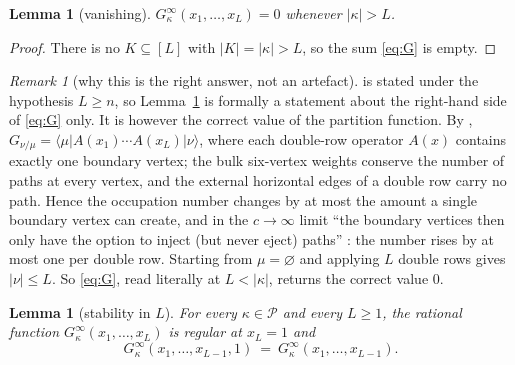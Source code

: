 \documentclass[11pt]{article}
\newtheorem{lem}[thm]{Lemma}
\theoremstyle{definition}
\theoremstyle{remark}
\newtheorem{rem}[thm]{Remark}
\newcommand{\PP}{\mathcal{P}}
\newcommand{\Gi}[1]{G^{\infty}_{#1}}
\begin{document}
\begin{lem}[vanishing]\label{lem:vanish}
$\Gi{\kappa}(x_1,\dots,x_L)=0$ whenever $|\kappa|>L$.
\end{lem}

\begin{proof}
There is no $K\subseteq[L]$ with $|K|=|\kappa|>L$, so the sum \eqref{eq:G} is empty.
\end{proof}

\begin{rem}[why this is the right answer, not an artefact]\label{rem:conserve}
\cite[Theorem \texttt{G nu thm}]{GDMW} is stated under the hypothesis $L\ge n$, so
Lemma~\ref{lem:vanish} is formally a statement about the right-hand side of \eqref{eq:G} only.
It is however the correct value of the partition function. By
\cite[\texttt{G partition function defn A eq}, line 2200]{GDMW},
$G_{\nu/\mu}=\langle\mu|A(x_1)\cdots A(x_L)|\nu\rangle$, where each double-row operator $A(x)$
contains exactly one boundary vertex; the bulk six-vertex weights conserve the number of paths
at every vertex, and the external horizontal edges of a double row carry no path. Hence the
occupation number changes by at most the amount a single boundary vertex can create, and in the
$c\to\infty$ limit ``the boundary vertices then only have the option to inject (but never
eject) paths'' \cite[line 3076]{GDMW}: the number rises by at most one per double row. Starting
from $\mu=\varnothing$ and applying $L$ double rows gives $|\nu|\le L$. So \eqref{eq:G}, read
literally at $L<|\kappa|$, returns the correct value $0$.
\end{rem}

\begin{lem}[stability in $L$]\label{lem:stab}
For every $\kappa\in\PP$ and every $L\ge1$, the rational function
$\Gi{\kappa}(x_1,\dots,x_L)$ is regular at $x_L=1$ and
\[
  \Gi{\kappa}(x_1,\dots,x_{L-1},1)\ =\ \Gi{\kappa}(x_1,\dots,x_{L-1}).
\]
\end{lem}
\end{document}
